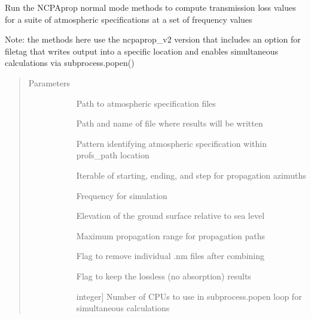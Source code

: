 \documentclass[letterpaper,10pt,english]{sphinxmanual}
\begin{document}
\begin{fulllineitems}
\label{\detokenize{stochprop.propagation:stochprop.propagation.run_modess}}
Run the NCPAprop normal mode methods to compute transmission
loss values for a suite of atmospheric specifications at
a set of frequency values

Note: the methods here use the ncpaprop\_v2 version that includes an option
for \textendash{}filetag that writes output into a specific location and enables
simultaneous calculations via subprocess.popen()
\begin{quote}\begin{description}
\item[{Parameters}] \leavevmode\begin{description}
\item[{}] \leavevmode
Path to atmospheric specification files

\item[{}] \leavevmode
Path and name of file where results will be written

\item[{}] \leavevmode
Pattern identifying atmospheric specification within profs\_path location

\item[{}] \leavevmode
Iterable of starting, ending, and step for propagation azimuths

\item[{}] \leavevmode
Frequency for simulation

\item[{}] \leavevmode
Elevation of the ground surface relative to sea level

\item[{}] \leavevmode
Maximum propagation range for propagation paths

\item[{}] \leavevmode
Flag to remove individual .nm files after combining

\item[{}] \leavevmode
Flag to keep the lossless (no absorption) results

\item[{}] \leavevmode{[}integer{]}
Number of CPUs to use in subprocess.popen loop for simultaneous calculations

\end{description}

\end{description}\end{quote}

\end{fulllineitems}
\end{document}
